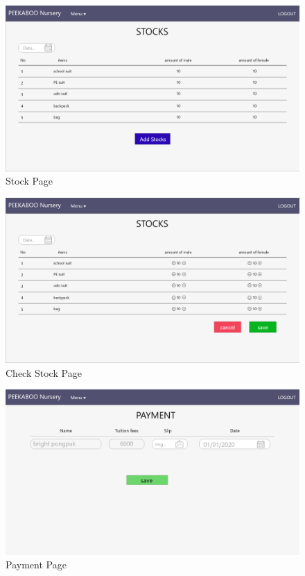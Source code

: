 \begin{figure}
  \begin{center}
  \includegraphics[width=140mm]{images/stockPage.png}
  \end{center}
  \caption[Poem]{Stock Page}
  \label{fig:Stock}
  \end{figure}

\begin{figure}
  \begin{center}
  \includegraphics[width=140mm]{images/stockPageChecking.png}
  \end{center}
  \caption[Poem]{Check Stock Page}
  \label{fig:CheckStock}
  \end{figure}

\begin{figure}
  \begin{center}
  \includegraphics[width=140mm]{images/paymentPage.png}
  \end{center}
  \caption[Poem]{Payment Page}
  \label{fig:Payment}
  \end{figure}



